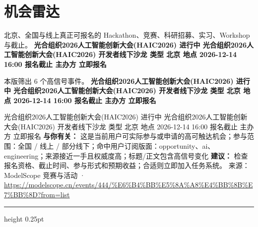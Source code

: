 \documentclass[10.5pt]{ctexart}
\begin{document}
\section*{机会雷达}
{\color{ormuted} 北京、全国与线上真正可报名的 Hackathon、竞赛、科研招募、实习、Workshop 与截止。}
\vspace{2mm}
{\LARGE\bfseries 光合组织2026人工智能创新大会(HAIC2026) 进行中 光合组织2026人工智能创新大会(HAIC2026) 开发者线下沙龙 类型 北京 地点 2026-12-14 16:00 报名截止 主办方 立即报名}\par
\vspace{1mm}
{\color{ormuted} 本版筛出 6 个高信号事件。}
\vspace{3mm}
{\Large\bfseries 光合组织2026人工智能创新大会(HAIC2026) 进行中 光合组织2026人工智能创新大会(HAIC2026) 开发者线下沙龙 类型 北京 地点 2026-12-14 16:00 报名截止 主办方 立即报名}\par
光合组织2026人工智能创新大会(HAIC2026) 进行中 光合组织2026人工智能创新大会(HAIC2026) 开发者线下沙龙 类型 北京 地点 2026-12-14 16:00 报名截止 主办方 立即报名
\textbf{与你有关：} 这是当前用户可实际参与或申请的高可触达机会；参与范围：全国 / 线上 / 部分线下；命中用户订阅版面：opportunity、ai、engineering；来源接近一手且权威度高；标题/正文包含高信号变化
\textbf{建议：} 检查报名资格、截止时间、参与形式和预期收益；合适则立即加入任务系统。
{\footnotesize\color{ormuted} 来源：ModelScope 竞赛与活动 · \url{https://modelscope.cn/events/444/%E6%B4%BB%E5%8A%A8%E4%BB%8B%E7%BB%8D?from=list}}
\vspace{4mm}
\hrule height 0.25pt
\vspace{3mm}
\end{document}
